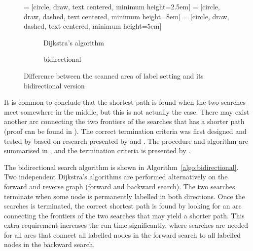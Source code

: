 \begin{figure}[H]
     = [circle, draw, text centered, minimum height=2.5em]
     = [circle, draw, dashed, text centered, minimum height=8em]
     = [circle, draw, dashed, text centered, minimum height=5em]
    \centering
    \begin{subfigure}[t]{.4\textwidth}
        \centering
        \caption{Dijkstra's algorithm}
    \end{subfigure}
    \begin{subfigure}[t]{.4\textwidth}
        \centering
        \caption{bidirectional}
    \end{subfigure}
    \caption{Difference between the scanned area of label setting and its bidirectional version}
    \label{fig:bidirect}
\end{figure}

It is common to conclude that the shortest path is found when the two searches meet somewhere in the middle,
but this is not actually the case.
There may exist another arc connecting the two frontiers of the searches that has a shorter path (proof can be found in \citet{Klunder}).
The correct termination criteria was first designed and tested by \citet{Pohl} based on research presented by \citet{Dantzig, Nicholson} and \citet{Dreyfus}.
The procedure and algorithm are summarised in \citet{Klunder}, and the termination criteria is presented by \citet{Pohl}.

The bidirectional search algorithm is shown in Algorithm~\ref{algo:bidirectional}.
Two independent Dijkstra's algorithms are performed alternatively on the forward and reverse graph (forward and backward search).
The two searches terminate when some node is permanently labelled in both directions.
Once the searches is terminated,
the correct shortest path is found by looking for an arc connecting the frontiers of the two searches that may yield a shorter path.
This extra requirement increases the run time significantly, 
where searches are needed for all arcs that connect all labelled nodes in the forward search to all labelled nodes in the backward search.

